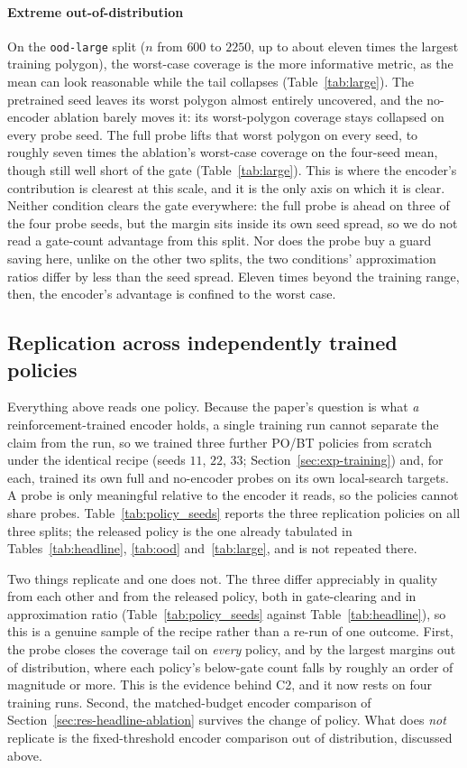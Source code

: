 \documentclass[11pt]{article}
\begin{document}
\paragraph{Extreme out-of-distribution} On the \texttt{ood-large} split ($n$ from $600$ to $2250$, up to about eleven times the largest training polygon), the worst-case coverage is the more informative metric, as the mean can look reasonable while the tail collapses (Table~\ref{tab:large}). The pretrained seed leaves its worst polygon almost entirely uncovered, and the no-encoder ablation barely moves it: its worst-polygon coverage stays collapsed on every probe seed. The full probe lifts that worst polygon on every seed, to roughly seven times the ablation's worst-case coverage on the four-seed mean, though still well short of the gate (Table~\ref{tab:large}). This is where the encoder's contribution is clearest at this scale, and it is the only axis on which it is clear. Neither condition clears the gate everywhere: the full probe is ahead on three of the four probe seeds, but the margin sits inside its own seed spread, so we do not read a gate-count advantage from this split. Nor does the probe buy a guard saving here, unlike on the other two splits, the two conditions' approximation ratios differ by less than the seed spread. Eleven times beyond the training range, then, the encoder's advantage is confined to the worst case.

\subsection{Replication across independently trained policies}
\label{sec:res-policy-seeds}

Everything above reads one policy. Because the paper's question is what \emph{a} reinforcement-trained encoder holds, a single training run cannot separate the claim from the run, so we trained three further PO/BT policies from scratch under the identical recipe (seeds $11$, $22$, $33$; Section~\ref{sec:exp-training}) and, for each, trained its own full and no-encoder probes on its own local-search targets. A probe is only meaningful relative to the encoder it reads, so the policies cannot share probes. Table~\ref{tab:policy_seeds} reports the three replication policies on all three splits; the released policy is the one already tabulated in Tables~\ref{tab:headline}, \ref{tab:ood} and~\ref{tab:large}, and is not repeated there.

Two things replicate and one does not. The three differ appreciably in quality from each other and from the released policy, both in gate-clearing and in approximation ratio (Table~\ref{tab:policy_seeds} against Table~\ref{tab:headline}), so this is a genuine sample of the recipe rather than a re-run of one outcome. First, the probe closes the coverage tail on \emph{every} policy, and by the largest margins out of distribution, where each policy's below-gate count falls by roughly an order of magnitude or more. This is the evidence behind C2, and it now rests on four training runs. Second, the matched-budget encoder comparison of Section~\ref{sec:res-headline-ablation} survives the change of policy. What does \emph{not} replicate is the fixed-threshold encoder comparison out of distribution, discussed above.
\end{document}
